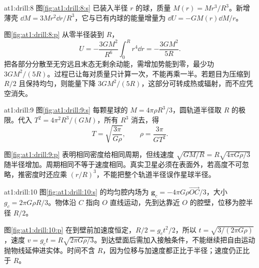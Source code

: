 \begin{drillsolution}{at1:drill:8}
  图\ref{fig:at1:drill:8:s} 已装入半径 $r$ 的球，质量 $M(r)=Mr^3/R^3$。新增薄壳 $\dd M=3Mr^2\dd r/R^3$，它与已有内球的能量增量为 $\dd U=-GM(r)\dd M/r$。

  图\ref{fig:at1:drill:8:p} 从零半径装到 $R$，
  \[U=-\frac{3GM^2}{R^6}\int_0^Rr^4\dd r=-\frac{3GM^2}{5R}.
  \]
  把各部分分散至无穷远且末态无剩余动能，需增加势能到零，最少功 $3GM^2/(5R)$。过程已让每对质量只计算一次，不能再乘一半。若题目为压缩到 $R/2$ 且保持均匀，则能量下降 $3GM^2/(5R)$，这部分可转成热或辐射，而不应凭空消失。\end{drillsolution}
\begin{drillsolution}{at1:drill:9}
  图\ref{fig:at1:drill:9:s} 每颗星球的 $M=4\pi\rho R^3/3$，圆轨道半径取 $R$ 的极限。代入 $T^2=4\pi^2R^3/(GM)$，所有 $R^3$ 消去，得
  \[T=\sqrt{\frac{3\pi}{G\rho}},\qquad \rho=\frac{3\pi}{GT^2}.
  \]

  图\ref{fig:at1:drill:9:p} 表明相同密度给相同周期，但线速度 $\sqrt{GM/R}=R\sqrt{4\pi G\rho/3}$ 随半径增加。周期相同不等于速度相同。真实卫星必须在表面外，若高度不可忽略，推密度时还应乘 $(r/R)^3$，不能把整个轨道半径误作星球半径。\end{drillsolution}
\begin{drillsolution}{at1:drill:10}
  图\ref{fig:at1:drill:10:s} 的均匀腔内场为 $\bm g_c=-4\pi G\rho\overrightarrow{OC}/3$，大小 $g_c=2\pi G\rho R/3$。物体沿 $C$ 指向 $O$ 直线运动，先到达靠近 $O$ 的腔壁，位移为腔半径 $R/2$。

  图\ref{fig:at1:drill:10:p} 在到壁前加速度恒定，$R/2=g_ct^2/2$，所以 $t=\sqrt{3/(2\pi G\rho)}$，速度 $v=g_ct=R\sqrt{2\pi G\rho/3}$。到达壁面后需加入接触条件，不能继续把自由运动抛物线延伸进实体。时间不含 $R$，因为位移与加速度都正比于半径；速度仍正比于 $R$。\end{drillsolution}
